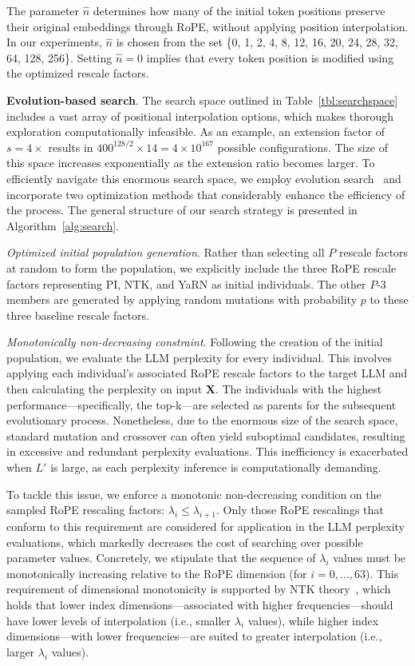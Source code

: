 The parameter $\hat{n}$ determines how many of the initial token positions preserve their original embeddings through RoPE, without applying position interpolation. In our experiments, $\hat{n}$ is chosen from the set \{0, 1, 2, 4, 8, 12, 16, 20, 24, 28, 32, 64, 128, 256\}. Setting $\hat{n}=0$ implies that every token position is modified using the optimized rescale factors.

\textbf{Evolution-based search}. The search space outlined in Table~\ref{tbl:searchspace} includes a vast array of positional interpolation options, which makes thorough exploration computationally infeasible. As an example, an extension factor of $s=4\times$ results in $400^{128/2}\times14=4\times10^{167}$ possible configurations. The size of this space increases exponentially as the extension ratio becomes larger. To efficiently navigate this enormous search space, we employ evolution search~\cite{guo2020single} and incorporate two optimization methods that considerably enhance the efficiency of the process. The general structure of our search strategy is presented in Algorithm~\ref{alg:search}.

\textit{Optimized initial population generation}. Rather than selecting all $P$ rescale factors at random to form the population, we explicitly include the three RoPE rescale factors representing PI, NTK, and YaRN as initial individuals. The other $P$-3 members are generated by applying random mutations with probability $p$ to these three baseline rescale factors.

\textit{Monotonically non-decreasing constraint}. Following the creation of the initial population, we evaluate the LLM perplexity for every individual. This involves applying each individual's associated RoPE rescale factors to the target LLM and then calculating the perplexity on input $\mathbf{X}$. The individuals with the highest performance—specifically, the top-k—are selected as parents for the subsequent evolutionary process. Nonetheless, due to the enormous size of the search space, standard mutation and crossover can often yield suboptimal candidates, resulting in excessive and redundant perplexity evaluations. This inefficiency is exacerbated when $L'$ is large, as each perplexity inference is computationally demanding.

To tackle this issue, we enforce a monotonic non-decreasing condition on the sampled RoPE rescaling factors: $\lambda_i\le \lambda_{i+1}$. Only those RoPE rescalings that conform to this requirement are considered for application in the LLM perplexity evaluations, which markedly decreases the cost of searching over possible parameter values. Concretely, we stipulate that the sequence of $\lambda_i$ values must be monotonically increasing relative to the RoPE dimension (for $i=0,\dots,63$). This requirement of dimensional monotonicity is supported by NTK theory~\cite{jacot2018neural,tancik2020fourier,ntk}, which holds that lower index dimensions—associated with higher frequencies—should have lower levels of interpolation (i.e., smaller $\lambda_i$ values), while higher index dimensions—with lower frequencies—are suited to greater interpolation (i.e., larger $\lambda_i$ values).


